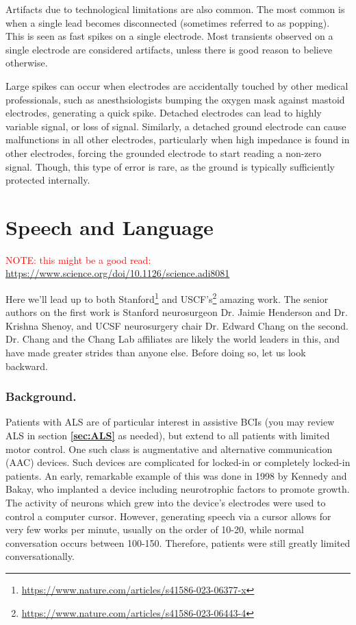 Artifacts due to technological limitations are also common. The most common is when a single lead becomes disconnected (sometimes referred to as popping). This is seen as fast spikes on a single electrode. Most transients observed on a single electrode are considered artifacts, unless there is good reason to believe otherwise.\newline

Large spikes can occur when electrodes are accidentally touched by other medical professionals, such as anesthsiologists bumping the oxygen mask against mastoid electrodes, generating a quick spike. Detached electrodes can lead to highly variable signal, or loss of signal. Similarly, a detached ground electrode can cause malfunctions in all other electrodes, particularly when high impedance is found in other electrodes, forcing the grounded electrode to start reading a non-zero signal. Though, this type of error is rare, as the ground is typically sufficiently protected internally. 

\section{Speech and Language}

\textcolor{red}{NOTE: this might be a good read:} \url{https://www.science.org/doi/10.1126/science.adi8081}

Here we'll lead up to both Stanford\footnote{\url{https://www.nature.com/articles/s41586-023-06377-x}} and USCF's\footnote{\url{https://www.nature.com/articles/s41586-023-06443-4}} amazing work. The senior authors on the first work is Stanford neurosurgeon Dr. Jaimie Henderson and Dr. Krishna Shenoy, and UCSF neurosurgery chair Dr. Edward Chang on the second. Dr. Chang and the Chang Lab affiliates are likely the world leaders in this, and have made greater strides than anyone else. Before doing so, let us look backward. 

\subsubsection{Background.}

Patients with ALS are of particular interest in assistive BCIs (you may review ALS in section \textbf{\ref{sec:ALS}} as needed), but extend to all patients with limited motor control. One such class is augmentative and alternative communication (AAC) devices. Such devices are complicated for locked-in or completely locked-in patients. An early, remarkable example of this was done in 1998 by Kennedy and Bakay, who implanted a device including neurotrophic factors to promote growth. The activity of neurons which grew into the device's electrodes were used to control a computer cursor. However, generating speech via a cursor allows for very few works per minute, usually on the order of 10-20, while normal conversation occurs between 100-150. Therefore, patients were still greatly limited conversationally. \newline

